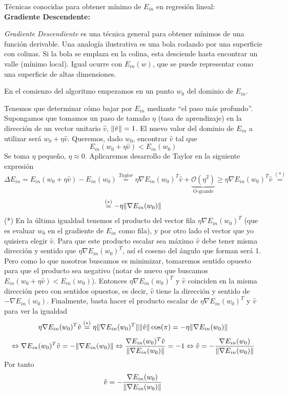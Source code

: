 \documentclass[11pt,a4paper]{article}
\DeclarePairedDelimiter{\norm}{\lVert}{\rVert}
\theoremstyle{definition}
\begin{document}
	Técnicas conocidas para obtener mínimo de $E_{in}$ en regresión lineal:\\
	
	\textbf{Gradiente Descendente:} $\quad \quad \quad \quad \quad \quad \quad \quad \quad \quad \quad \quad \quad \quad \quad \quad \quad \quad \quad \quad \quad  $ %
	
	\textit{Gradiente Descendiente} es una técnica general para obtener mínimos de una función derivable. Una analogía ilustrativa es una bola rodando por una superficie con colinas. Si la bola se emplaza en la colina, esta desciende hasta encontrar un valle (mínimo local). Igual ocurre con $E_{in}(w)$, que se puede representar como una superficie de altas dimensiones.
	
	 En el comienzo del algoritmo empezamos en un punto $w_0$ del dominio de $E_{in}$.
	
	
	Tenemos que determinar cómo bajar por $E_{in}$ mediante ``el paso más profundo''. Supongamos que tomamos un paso de tamaño $\eta$ (tasa de aprendizaje) en la dirección de un vector unitario $\hat v$, $\norm{\hat v}=1$. El nuevo valor del dominio de $E_{in}$ a utilizar será $w_0+\eta \hat v$. Queremos, dado $w_0$, encontrar $\hat v$ tal que $$E_{in}(w_0+\eta \hat v)<E_{in}(w_0)$$
Se toma $\eta$ pequeño, $\eta \approx 0$. Aplicaremos desarrollo de Taylor en la siguiente expresión
	$$\Delta E_{in}=E_{in}(w_0+\eta \hat v) - E_{in}(w_0)\stackrel{Taylor}{=} \eta \nabla E_{in}(w_0)^T\hat v + \underbrace{\mathcal{O}(\eta ^2)}_{\text{O-grande}} \geq  \eta \nabla E_{in}(w_0)^T\hat v  \stackrel{(*)}{=}$$ $$ \stackrel{(*)}{=}-\eta \norm{\nabla E_{in}(w_0)}$$
	(*) En la última igualdad tenemos el producto del vector fila $\eta \nabla E_{in}(w_0)^T$ (que es evaluar $w_0$ en el gradiente de $E_{in}$ como fila), y por otro lado el vector que yo quisiera elegir $\hat v$. Para que este producto escalar sea máximo $\hat v$ debe tener misma dirección y sentido que $\eta \nabla E_{in}(w_0)^T$, así el coseno del ángulo que forman será 1. Pero como lo que nosotros buscamos es minimizar, tomaremos sentido opuesto para que el producto sea negativo (notar de nuevo que buscamos $E_{in}(w_0+\eta \hat v)<E_{in}(w_0)$). Entonces $\eta \nabla E_{in}(w_0)^T$ y $\hat v$ coinciden en la misma dirección pero con sentidos opuestos, es decir, $\hat v$ tiene la dirección y sentido de $-\nabla E_{in}(w_0)$. Finalmente, basta hacer el producto escalar de $\eta \nabla E_{in}(w_0)^T$ y $\hat v$  para ver la igualdad $$\eta \nabla E_{in}(w_0)^T \hat v\stackrel{(*)}{=} \eta \norm{\nabla E_{in}(w_0)^T} \norm{\hat v} \cos(\pi)=-\eta \norm{\nabla E_{in}(w_0)} $$
	$$\Leftrightarrow \nabla E_{in}(w_0)^T \hat v= -\norm{\nabla E_{in}(w_0)} \Leftrightarrow \frac{\nabla E_{in}(w_0)^T \hat v}{\norm{\nabla E_{in}(w_0)}}= -1 \Leftrightarrow \hat v=-\frac{\nabla E_{in}(w_0)}{\norm{\nabla E_{in}(w_0)}}$$
	Por tanto
	$$\hat v=-\frac{\nabla E_{in}(w_0)}{\norm{\nabla E_{in}(w_0)}}$$
	
\end{document}
